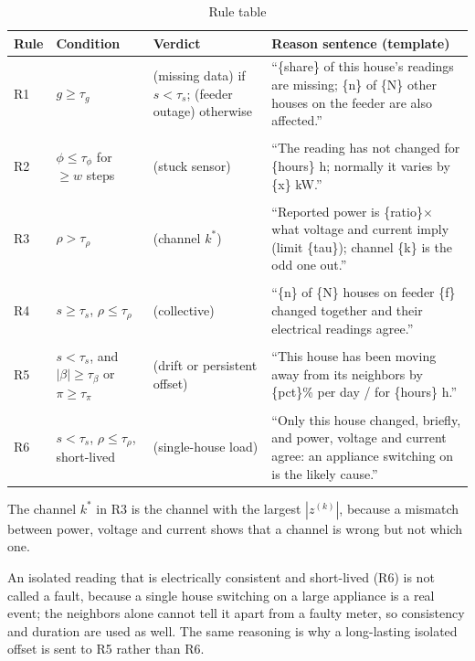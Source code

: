 \documentclass[11pt,a4paper]{article}
\begin{document}
\begin{table}[H]
\centering
\small
\begin{tabularx}{\textwidth}{@{}>{\raggedright\arraybackslash}p{0.9cm}>{\raggedright\arraybackslash}p{4.2cm}>{\raggedright\arraybackslash}p{3cm}L@{}}
\toprule
\textbf{Rule} & \textbf{Condition} & \textbf{Verdict} & \textbf{Reason sentence (template)} \\
\midrule
R1 & $g\ge\tau_g$ & \MF{} (missing data) if $s<\tau_s$; \GE{} (feeder outage) otherwise & ``\{share\} of this house's readings are missing; \{n\} of \{N\} other houses on the feeder are also affected.'' \\ \\
R2 & $\phi\le\tau_\phi$ for $\ge w$ steps & \MF{} (stuck sensor) & ``The reading has not changed for \{hours\} h; normally it varies by \{x\} kW.'' \\ \\
R3 & $\rho>\tau_\rho$ & \MF{} (channel $k^\ast$) & ``Reported power is \{ratio\}$\times$ what voltage and current imply (limit \{tau\}); channel \{k\} is the odd one out.'' \\ \\
R4 & $s\ge\tau_s$, $\rho\le\tau_\rho$ & \GE{} (collective) & ``\{n\} of \{N\} houses on feeder \{f\} changed together and their electrical readings agree.'' \\ \\
R5 & $s<\tau_s$, and $|\beta|\ge\tau_\beta$ or $\pi\ge\tau_\pi$ & \MF{} (drift or persistent offset) & ``This house has been moving away from its neighbors by \{pct\}\% per day / for \{hours\} h.'' \\ \\
R6 & $s<\tau_s$, $\rho\le\tau_\rho$, short-lived & \GE{} (single-house load) & ``Only this house changed, briefly, and power, voltage and current agree: an appliance switching on is the likely cause.'' \\
\bottomrule
\end{tabularx}
\caption{Rule table}
\label{tab:rules}
\end{table}

The channel $k^\ast$ in R3 is the channel with the largest $|z^{(k)}|$, because a mismatch between power, voltage and current shows that a channel is wrong but not which one.

An isolated reading that is electrically consistent and short-lived (R6) is not called a fault, because a
single house switching on a large appliance is a real event; the neighbors alone cannot tell it apart from
a faulty meter, so consistency and duration are used as well. The same reasoning is why a long-lasting
isolated offset is sent to R5 rather than R6.
\end{document}
